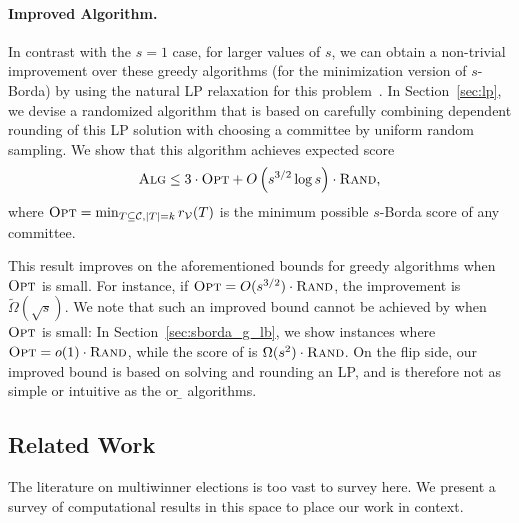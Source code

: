 \paragraph{Improved Algorithm.}
In contrast with the $s=1$ case, for larger values of $s$, we can obtain a non-trivial improvement over these greedy algorithms (for the minimization version of $s$-Borda) by using the natural LP relaxation for this problem~\cite{Byrka}. In Section~\ref{sec:lp}, we devise a randomized algorithm that is based on carefully combining dependent rounding of this LP solution with choosing a committee by uniform random sampling. We show that this  algorithm achieves expected score 
\[
{\normalfont\textsc{Alg}} \le 3 \cdot {\normalfont\textsc{Opt}} + O\left(s^{3/2} \log s \right) \cdot {\normalfont\textsc{Rand}},
\]
where ${\normalfont\textsc{Opt}} = \min_{T \subseteq \mathcal{C}, |T| = k} r_{\mathcal{V}}(T)$ is the minimum possible $s$-Borda score of any committee. 

This result improves on the aforementioned bounds for greedy algorithms when ${\normalfont\textsc{Opt}}$ is small. For instance, if ${\normalfont\textsc{Opt}} = O(s^{3/2}) \cdot {\normalfont\textsc{Rand}}$, the improvement is $\tilde{\Omega}(\sqrt{s})$.  We note that such an improved bound cannot be achieved by \g{} when ${\normalfont\textsc{Opt}}$ is small: In Section~\ref{sec:sborda_g_lb}, we show instances where ${\normalfont\textsc{Opt}} = o(1) \cdot {\normalfont\textsc{Rand}}$, while the score of \g{} is $\Omega(s^2)\cdot {\normalfont\textsc{Rand}}$. On the flip side, our improved bound is based on solving and rounding an LP, and is therefore not as simple or intuitive as the \g{} or \b{} algorithms.


\subsection{Related Work}
The literature on multiwinner elections is too vast to survey here. We present a survey of computational results in this space to place our work in context.

